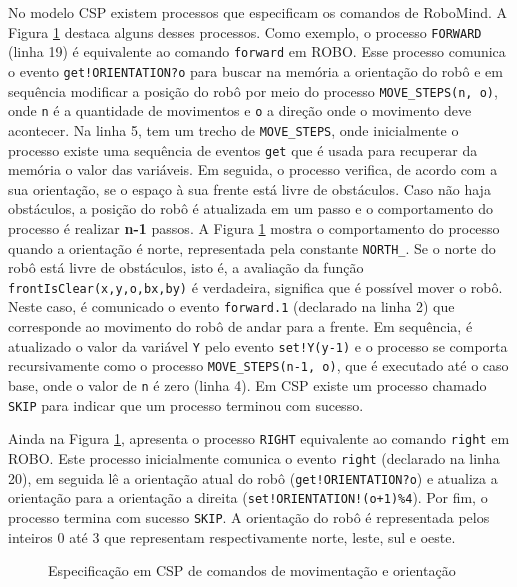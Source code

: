 No modelo CSP existem processos que especificam os comandos de RoboMind. A Figura \ref{fig:model2} destaca alguns desses processos. Como exemplo, o processo \texttt{FORWARD} (linha 19) é equivalente ao comando \texttt{forward} em ROBO. Esse processo comunica o evento \texttt{get!ORIENTATION?o} para buscar na memória a orientação do robô e em sequência modificar a posição do robô por meio do processo \texttt{MOVE\_STEPS(n, o)}, onde \texttt{n} é a quantidade de movimentos e \texttt{o} a direção onde o movimento deve acontecer. Na linha 5, tem um trecho de \texttt{MOVE\_STEPS}, onde inicialmente o processo existe uma sequência de eventos \texttt{get} que é usada para recuperar da memória o valor das variáveis. Em seguida, o processo verifica, de acordo com a sua orientação, se o espaço à sua frente está livre de obstáculos. Caso não haja obstáculos, a posição do robô é atualizada em um passo e o comportamento do processo é realizar \textbf{n-1} passos. A Figura \ref{fig:model2} mostra o comportamento do processo quando a orientação é norte, representada pela constante \texttt{NORTH\_}. Se o norte do robô está livre de obstáculos, isto é, a avaliação da função \texttt{frontIsClear(x,y,o,bx,by)} é verdadeira, significa que é possível mover o robô. Neste caso, é comunicado o evento \texttt{forward.1} (declarado na linha 2) que corresponde ao movimento do robô de andar para a frente. Em sequência, é atualizado o valor da variável \texttt{Y} pelo evento \texttt{set!Y(y-1)} e o processo se comporta recursivamente como o processo \texttt{MOVE\_STEPS(n-1, o)}, que é executado até o caso base, onde o valor de \texttt{n} é zero (linha 4). Em CSP existe um processo chamado \texttt{SKIP} para indicar que um processo terminou com sucesso. 

Ainda na Figura \ref{fig:model2}, apresenta o processo \texttt{RIGHT} equivalente ao comando \texttt{right} em ROBO. Este processo inicialmente comunica o evento \texttt{right} (declarado na linha 20), em seguida lê a orientação atual do robô (\texttt{get!ORIENTATION?o}) e atualiza a orientação para a orientação a direita  (\texttt{set!ORIENTATION!(o+1)\%4}). Por fim, o processo termina com sucesso \texttt{SKIP}. A orientação do robô é representada pelos inteiros 0 até 3 que representam respectivamente norte, leste, sul e oeste. 

\begin{figure}[h]
\caption{Especificação em CSP de comandos de movimentação e orientação}

\label{fig:model2}
\end{figure}


